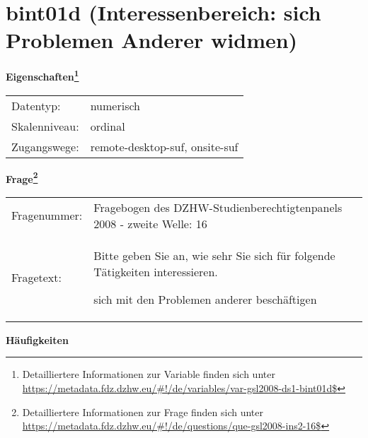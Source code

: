 
    \setcounter{footnote}{0}

    \vspace*{-1.8cm}
	\section{bint01d (Interessenbereich: sich Problemen Anderer widmen)}
	\label{section:bint01d}



    \vspace*{0.5cm}
    \noindent\textbf{Eigenschaften\footnote{Detailliertere Informationen zur Variable finden sich unter
		\url{https://metadata.fdz.dzhw.eu/\#!/de/variables/var-gsl2008-ds1-bint01d$}}}\\
	\begin{tabularx}{\hsize}{@{}lX}
	Datentyp: & numerisch \\
	Skalenniveau: & ordinal \\
	Zugangswege: &
	  remote-desktop-suf, 
	  onsite-suf
 \\
    \end{tabularx}



				\vspace*{0.5cm}
                \noindent\textbf{Frage\footnote{Detailliertere Informationen zur Frage finden sich unter
		              \url{https://metadata.fdz.dzhw.eu/\#!/de/questions/que-gsl2008-ins2-16$}}}\\
				\begin{tabularx}{\hsize}{@{}lX}
					Fragenummer: &
					  Fragebogen des DZHW-Studienberechtigtenpanels 2008 - zweite Welle:
					  16
 \\
					Fragetext: & Bitte geben Sie an, wie sehr Sie sich für folgende Tätigkeiten interessieren.\par  sich mit den Problemen anderer beschäftigen \\
				\end{tabularx}





        		\vspace*{0.5cm}
                \noindent\textbf{Häufigkeiten}

